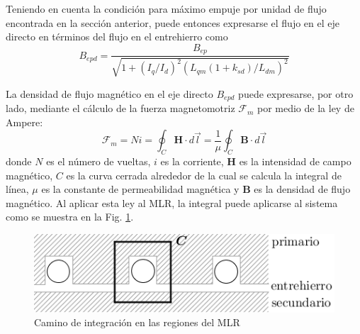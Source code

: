Teniendo en cuenta la condición para máximo empuje por unidad de flujo encontrada en la sección anterior, puede entonces expresarse el flujo en el eje directo en términos del flujo en el entrehierro como
\begin{equation}
B_{epd} = \frac{B_{ep}}{\sqrt{1+(I_q/I_d)^2(L_{qm}(1+k_{sd})/L_{dm})^2}}
\end{equation}

La densidad de flujo magnético en el eje directo $B_{epd}$ puede expresarse, por otro lado, mediante el cálculo de la fuerza magnetomotriz $\mathscr{F}_m$ por medio de la ley de Ampere:
\begin{equation*}
\mathscr{F}_m = Ni = \oint_C \mathbf{H}\cdot d\vec{l}
= \frac{1}{\mu}\oint_C\mathbf{B}\cdot d\vec{l}
\end{equation*}
donde $N$ es el número de vueltas, $i$ es la corriente, $\mathbf{H}$ es la intensidad de campo magnético, $C$ es la curva cerrada alrededor de la cual se calcula la integral de línea, $\mu$ es la constante de permeabilidad magnética y $\mathbf{B}$ es la densidad de flujo magnético. Al aplicar esta ley al MLR, la integral puede aplicarse al sistema como se muestra en la Fig. \ref{mmfcalc}.
\begin{figure}[t]
\centering
\includegraphics[scale=0.7]{../img/Teoria_del_MLR/mmfcalc}
\caption{Camino de integración en las regiones del MLR}
\label{mmfcalc}
\end{figure}

